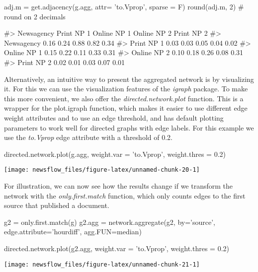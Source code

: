 \begin{Schunk}
\begin{Sinput}
adj.m = get.adjacency(g.agg, attr= 'to.Vprop', sparse = F)
round(adj.m, 2) # round on 2 decimals
\end{Sinput}
\begin{Soutput}
#>             Newsagency Print NP 1 Online NP 1 Online NP 2 Print NP 2
#> Newsagency        0.16       0.24        0.88        0.82       0.34
#> Print NP 1        0.03       0.03        0.05        0.04       0.02
#> Online NP 1       0.15       0.22        0.11        0.33       0.31
#> Online NP 2       0.10       0.18        0.26        0.08       0.31
#> Print NP 2        0.02       0.01        0.03        0.07       0.01
\end{Soutput}
\end{Schunk}

Alternatively, an intuitive way to present the aggregated network is by
visualizing it. For this we can use the visualization features of the
\emph{igraph} package. To make this more convenient, we also offer the
\emph{directed.network.plot} function. This is a wrapper for the
plot.igraph function, which makes it easier to use different edge weight
attributes and to use an edge threshold, and has default plotting
parameters to work well for directed graphs with edge labels. For this
example we use the \emph{to.Vprop} edge attribute with a threshold of
0.2.

\begin{Schunk}
\begin{Sinput}
directed.network.plot(g.agg, weight.var = 'to.Vprop',
                       weight.thres = 0.2)
\end{Sinput}


\begin{center}\texttt{[image: newsflow\_files/figure-latex/unnamed-chunk-20-1]} \end{center}

\end{Schunk}

For illustration, we can now see how the results change if we transform
the network with the \emph{only.first.match} function, which only counts
edges to the first source that published a document.

\begin{Schunk}
\begin{Sinput}
g2 = only.first.match(g)
g2.agg = network.aggregate(g2, by='source', edge.attribute='hourdiff', agg.FUN=median)

directed.network.plot(g2.agg, weight.var = 'to.Vprop',
                       weight.thres = 0.2)
\end{Sinput}


\begin{center}\texttt{[image: newsflow\_files/figure-latex/unnamed-chunk-21-1]} \end{center}

\end{Schunk}

